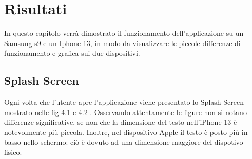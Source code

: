 \chapter{Risultati}
In questo capitolo verr\`a dimostrato il funzionamento dell'applicazione su un Samsung s9 e un Iphone 13, in modo da visualizzare le piccole 
differenze di funzionamento e grafica sui due dispositivi.
\section*{Splash Screen}
Ogni volta che l'utente apre l'applicazione viene presentato lo Splash Screen mostrato nelle fig 4.1 e 4.2 . Osservando attentamente le figure non si notano differenze significative, se non che la dimensione del testo nell'iPhone 13 \`e notevolmente pi\`u piccola.
Inoltre, nel dispositivo Apple il testo \`e posto pi\`u in basso nello schermo: ci\`o \`e  dovuto ad una dimensione maggiore del dispotivo fisico.

